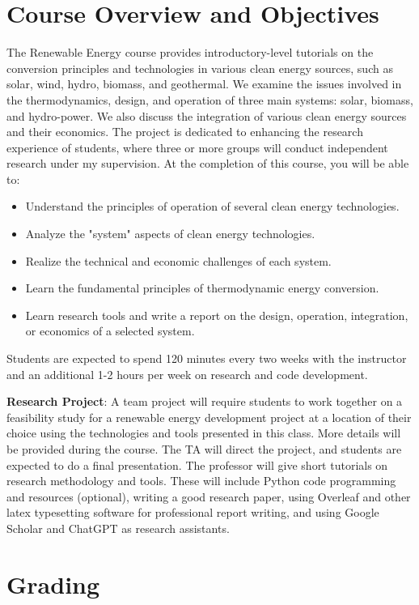 \documentclass[11pt]{article}
\begin{document}
\section{Course Overview and Objectives}
The Renewable Energy course provides introductory-level tutorials on the 
conversion principles and technologies in various clean energy sources, such as solar, wind, hydro, biomass, and geothermal. We examine the issues involved in the thermodynamics, design, and operation of three main systems: solar, biomass, and hydro-power. We also discuss the integration of various clean energy sources and their economics. The project is dedicated to enhancing the research experience of students, where three or more groups will conduct independent research under my supervision. At the completion of this course, you will be able to:
\begin{itemize}
    \item Understand the principles of operation of several clean energy technologies.
    \item Analyze the "system" aspects of clean energy technologies.
     \item Realize the technical and economic challenges of each system.
    \item Learn the fundamental principles of thermodynamic energy conversion.
    \item Learn research tools and write a report on the design, operation, integration, or economics of a selected system.
\end{itemize}


Students are expected to spend 120 minutes every two weeks with the instructor and an additional 1-2 hours per week on research and code development.

\textbf{Research Project}: A team project will require students to work together on a feasibility study for a renewable energy development project at a location of their choice using the technologies and tools presented in this class. More details will be provided during the course. The TA will direct the project, and students are expected to do a final presentation. The professor will give short tutorials on research methodology and tools.  These will include Python code programming and resources (optional), writing a good research paper, using Overleaf and other latex typesetting software for professional report writing, and using Google Scholar and ChatGPT as research assistants.

\newpage

\section{Grading}
	
\end{document}
